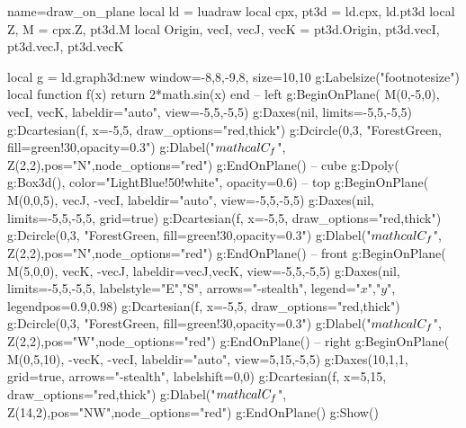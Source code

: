 \begin{luadraw}{name=draw_on_plane}
local ld = luadraw
local cpx, pt3d = ld.cpx, ld.pt3d
local Z, M = cpx.Z, pt3d.M
local Origin, vecI, vecJ, vecK = pt3d.Origin, pt3d.vecI, pt3d.vecJ, pt3d.vecK

local g = ld.graph3d:new{ window={-8,8,-9,8}, size={10,10}}
g:Labelsize("footnotesize")
local function f(x) return 2*math.sin(x) end
-- left
g:BeginOnPlane( {M(0,-5,0), vecI, vecK}, {labeldir="auto", view={-5,5,-5,5}})
    g:Daxes(nil, {limits={{-5,5},{-5,5}}})
    g:Dcartesian(f, {x={-5,5}, draw_options="red,thick"})
    g:Dcircle(0,3, "ForestGreen, fill=green!30,opacity=0.3")
    g:Dlabel("$\\mathcal{C}_{f}$", Z(2,2),{pos="N",node_options="red"})
g:EndOnPlane()
-- cube
g:Dpoly( g:Box3d(), {color="LightBlue!50!white", opacity=0.6})
-- top
g:BeginOnPlane( {M(0,0,5), vecJ, -vecI}, {labeldir="auto", view={-5,5,-5,5}})
    g:Daxes(nil, {limits={{-5,5},{-5,5}}, grid=true})
    g:Dcartesian(f, {x={-5,5}, draw_options="red,thick"})
    g:Dcircle(0,3, "ForestGreen, fill=green!30,opacity=0.3")
    g:Dlabel("$\\mathcal{C}_{f}$", Z(2,2),{pos="N",node_options="red"})
g:EndOnPlane() 
-- front
g:BeginOnPlane( {M(5,0,0), vecK, -vecJ}, {labeldir={vecJ,vecK}, view={-5,5,-5,5}})
    g:Daxes(nil, {limits={{-5,5},{-5,5}}, labelstyle={"E","S"}, arrows="-stealth",
        legend={"$x$","$y$"}, legendpos={0.9,0.98}})
    g:Dcartesian(f, {x={-5,5}, draw_options="red,thick"})
    g:Dcircle(0,3, "ForestGreen, fill=green!30,opacity=0.3")
    g:Dlabel("$\\mathcal{C}_{f}$", Z(2,2),{pos="W",node_options="red"})
g:EndOnPlane()
-- right
g:BeginOnPlane( {M(0,5,10), -vecK, -vecI}, {labeldir="auto", view={5,15,-5,5}})
    g:Daxes({10,1,1}, {grid=true, arrows="-stealth", labelshift={0,0}})
    g:Dcartesian(f, {x={5,15}, draw_options="red,thick"})
    g:Dlabel("$\\mathcal{C}_{f}$", Z(14,2),{pos="NW",node_options="red"})
g:EndOnPlane()
g:Show()
\end{luadraw}
